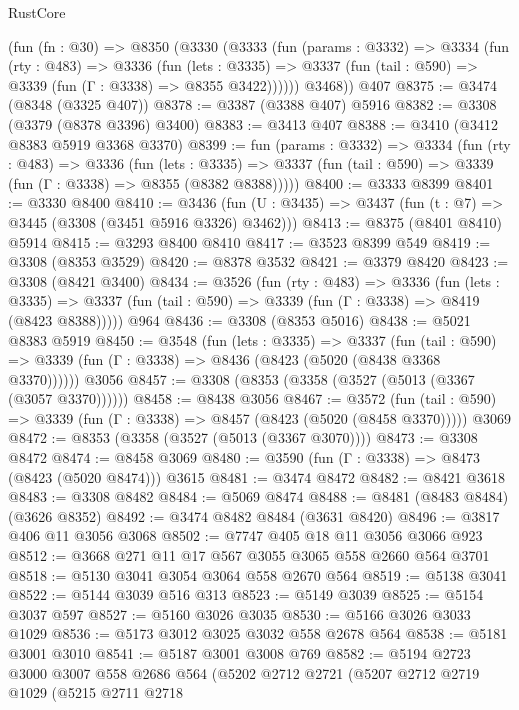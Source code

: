 \begin{lexlean}{RustCore}
\begin{coremodule}
    (fun (fn : @30) =>
    @8350
      (@3330
        (@3333
          (fun (params : @3332) =>
          @3334
            (fun (rty : @483) =>
            @3336
              (fun (lets : @3335) =>
              @3337 (fun (tail : @590) => @3339 (fun (Γ : @3338) => @8355 @3422))))))
        @3468))
    @407
@8375 := @3474 (@8348 (@3325 @407))
@8378 := @3387 (@3388 @407) @5916
@8382 := @3308 (@3379 (@8378 @3396) @3400)
@8383 := @3413 @407
@8388 := @3410 (@3412 @8383 @5919 @3368 @3370)
@8399 := fun (params : @3332) =>
  @3334
    (fun (rty : @483) =>
    @3336
      (fun (lets : @3335) =>
      @3337 (fun (tail : @590) => @3339 (fun (Γ : @3338) => @8355 (@8382 @8388)))))
@8400 := @3333 @8399
@8401 := @3330 @8400
@8410 := @3436 (fun (U : @3435) => @3437 (fun (t : @7) => @3445 (@3308 (@3451 @5916 @3326) @3462)))
@8413 := @8375 (@8401 @8410) @5914
@8415 := @3293 @8400 @8410
@8417 := @3523 @8399 @549
@8419 := @3308 (@8353 @3529)
@8420 := @8378 @3532
@8421 := @3379 @8420
@8423 := @3308 (@8421 @3400)
@8434 := @3526
    (fun (rty : @483) =>
    @3336
      (fun (lets : @3335) =>
      @3337 (fun (tail : @590) => @3339 (fun (Γ : @3338) => @8419 (@8423 @8388)))))
    @964
@8436 := @3308 (@8353 @5016)
@8438 := @5021 @8383 @5919
@8450 := @3548
    (fun (lets : @3335) =>
    @3337
      (fun (tail : @590) => @3339 (fun (Γ : @3338) => @8436 (@8423 (@5020 (@8438 @3368 @3370))))))
    @3056
@8457 := @3308 (@8353 (@3358 (@3527 (@5013 (@3367 (@3057 @3370))))))
@8458 := @8438 @3056
@8467 := @3572
    (fun (tail : @590) => @3339 (fun (Γ : @3338) => @8457 (@8423 (@5020 (@8458 @3370)))))
    @3069
@8472 := @8353 (@3358 (@3527 (@5013 (@3367 @3070))))
@8473 := @3308 @8472
@8474 := @8458 @3069
@8480 := @3590 (fun (Γ : @3338) => @8473 (@8423 (@5020 @8474))) @3615
@8481 := @3474 @8472
@8482 := @8421 @3618
@8483 := @3308 @8482
@8484 := @5069 @8474
@8488 := @8481 (@8483 @8484) (@3626 @8352)
@8492 := @3474 @8482 @8484 (@3631 @8420)
@8496 := @3817 @406 @11 @3056 @3068
@8502 := @7747 @405 @18 @11 @3056 @3066 @923
@8512 := @3668 @271 @11 @17 @567 @3055 @3065 @558 @2660 @564 @3701
@8518 := @5130 @3041 @3054 @3064 @558 @2670 @564
@8519 := @5138 @3041
@8522 := @5144 @3039 @516 @313
@8523 := @5149 @3039
@8525 := @5154 @3037 @597
@8527 := @5160 @3026 @3035
@8530 := @5166 @3026 @3033 @1029
@8536 := @5173 @3012 @3025 @3032 @558 @2678 @564
@8538 := @5181 @3001 @3010
@8541 := @5187 @3001 @3008 @769
@8582 := @5194
    @2723
    @3000
    @3007
    @558
    @2686
    @564
    (@5202
      @2712
      @2721
      (@5207
        @2712
        @2719
        @1029
        (@5215
          @2711
          @2718

\end{coremodule}
\end{lexlean}
